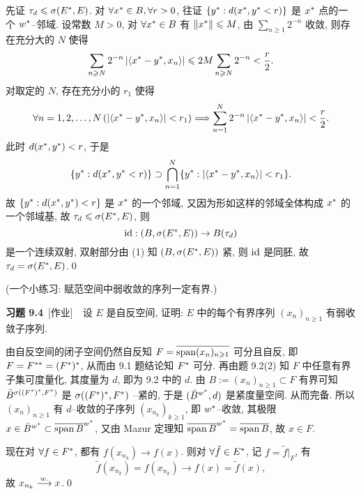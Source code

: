 \begin{Proof}
    先证 $ \tau_{d}\leqslant\sigma(E^{*}, E) $. 对 $ \forall x^{*}\in B, \forall r>0 $, 往证 $ \{ y^{*}: d(x^{*}, y^{*}<r) \} $ 是 $ x^{*} $ 点的一个 $ w^{*} $--邻域. 设常数 $ M>0 $, 对 $ \forall x^{*}\in B $ 有 $ \left\| x^{*} \right\|\leqslant M $, 由 $ \sum\limits_{n\geqslant1}2^{-n} $ 收敛, 则存在充分大的 $ N $ 使得
    \[
        \sum_{n\geqslant N}2^{-n}\left| \left\langle x^{*}-y^{*}, x_{n} \right\rangle \right| \leqslant 2M\sum_{n\geqslant N}2^{-n}<\frac{r}{2}.
    \]
    对取定的 $ N $, 存在充分小的 $ r_{1} $ 使得
    \[
        \forall n=1, 2, \dots, N\,(\left| \left\langle x^{*}-y^{*}, x_{n} \right\rangle \right| <r_{1})\Longrightarrow \sum_{n=1}^{N} 2^{-n}\left| \left\langle x^{*}-y^{*}, x_{n} \right\rangle \right| <\frac{r}{2}.
    \]
    此时 $ d(x^{*}, y^{*})<r $, 于是
    \[
        \{ y^{*}:d(x^{*}, y^{*}<r) \}\supset \bigcap_{n=1}^{N}\{ y^{*}:\left| \left\langle x^{*}-y^{*}, x_{n} \right\rangle \right| <r_{1} \}.
    \]
    故 $ \{ y^{*}: d(x^{*}, y^{*})<r \} $ 是 $ x^{*} $ 的一个邻域, 又因为形如这样的邻域全体构成 $ x^{*} $ 的一个邻域基, 故 $ \tau_{d}\leqslant\sigma(E^{*}, E) $, 则
    \[
        \mathrm{id}: (B, \sigma(E^{*}, E))\to B(\tau_{d})
    \]
    是一个连续双射, 双射部分由 (1) 知 $ (B, \sigma(E^{*}, E)) $ 紧, 则 $ \mathrm{id} $ 是同胚, 故 $ \tau_{d}=\sigma(E^{*}, E) $.\qed
    \end{Proof}
    
    (一个小练习: 赋范空间中弱收敛的序列一定有界.)

    \textbf{习题 9.4}\ [作业]\ \ 设 $ E $ 是自反空间, 证明: $ E $ 中的每个有界序列 $ (x_{n})_{n\geqslant1} $ 有弱收敛子序列.
    \begin{Proof}
        由自反空间的闭子空间仍然自反知 $ F=\overline{\operatorname{span}(x_{n})_{n\geqslant1}} $ 可分且自反, 即 $ F=F^{**}=(F^{*})^{*} $, 从而由 9.1 题结论知 $ F^{*} $ 可分. 再由题 9.2(2) 知 $ F $ 中任意有界子集可度量化, 其度量为 $ d $, 即为 9.2 中的 $ d $. 由 $ B:=(x_{n})_{n\geqslant1}\subset F $ 有界可知 $ \bar{B}^{\sigma((F^{*})^{*}, F^{*})} $ 是 $ \sigma((F^{*})^{*}, F^{*}) $ --紧的, 于是 $ (\bar{B}^{w^{*}}, d) $ 是紧度量空间. 从而完备. 所以 $ (x_{n})_{n\geqslant1} $ 有 $ d $--收敛的子序列 $ (x_{n_{k}})_{k\geqslant1} $, 即 $ w^{*} $--收敛, 其极限 $ x\in\bar{B}^{w^{*}}\subset\overline{\operatorname{span} B}^{w^{*}} $, 又由 Mazur 定理知 $ \overline{\operatorname{span} B}^{w^{*}}=\overline{\operatorname{span} B} $, 故 $ x\in F $.

        现在对 $ \forall f\in F^{*} $, 都有 $  f(x_{n_{k}})\to f(x) $. 则对 $ \forall \tilde{f}\in E^{*} $, 记 $ f = \tilde{f}|_{F} $, 有
        \[
            \tilde{f}(x_{n_{k}})=f(x_{n_{k}})\to f(x)=\tilde{f}(x),
        \]
        故 $ x_{n_{k}}\overset{w.}{\longrightarrow} x $.\qed
    \end{Proof}
    
